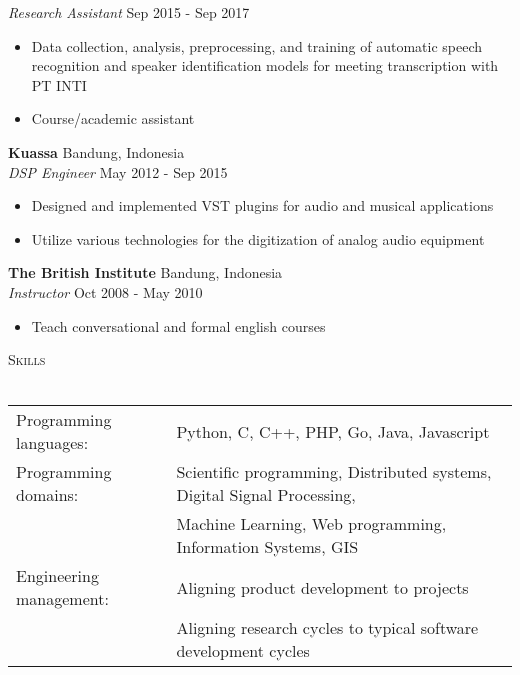 \documentclass[a4paper]{article}
\newcommand{\lineunder} {
    \vspace*{-8pt} \\
    \hspace*{-18pt} \hrulefill \\
}
\newcommand{\header} [1] {
    {\hspace*{-18pt}\vspace*{6pt} \textsc{#1}}
    \vspace*{-6pt} \lineunder
}
\begin{document}
\textit{Research Assistant} \hfill Sep 2015 - Sep 2017\\
\vspace{-3mm}
\begin{itemize} \itemsep 1pt
	\item Data collection, analysis, preprocessing, and training of automatic
    speech recognition and speaker identification models for meeting
    transcription with PT INTI
  \item Course/academic assistant
\end{itemize}
\textbf{Kuassa} \hfill Bandung, Indonesia\\
\textit{DSP Engineer} \hfill May 2012 - Sep 2015\\
\vspace{-3mm}
\begin{itemize} \itemsep 1pt
	\item Designed and implemented VST plugins for audio and musical applications
  \item Utilize various technologies for the digitization of analog audio
    equipment
\end{itemize}
\textbf{The British Institute} \hfill Bandung, Indonesia\\
\textit{Instructor} \hfill Oct 2008 - May 2010\\
\vspace{-3mm}
\begin{itemize} \itemsep 1pt
	\item Teach conversational and formal english courses
\end{itemize}
\vspace{3mm}

\header{Skills}
\vspace{3mm}
\begin{tabular}{ l l }
\vspace{3mm}
	Programming languages: & Python, C, C++, PHP, Go, Java, Javascript \\
	Programming domains:   & Scientific programming, Distributed systems, 
  Digital Signal Processing, \\
\vspace{3mm}
                         & Machine Learning, Web programming, Information
                         Systems, GIS \\
  Engineering management:& Aligning product development to projects \\
\vspace{3mm}
                         & Aligning research cycles to typical software
                         development cycles \\
\end{tabular}
\end{document}
